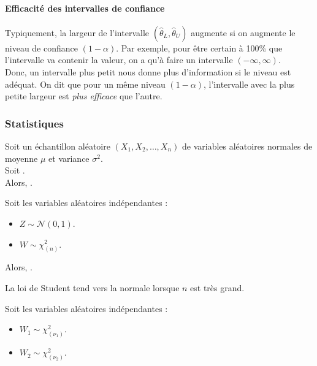 \documentclass[10pt, french]{article}
\begin{document}
\begin{multicols*}{2}
\paragraph{Efficacité des intervalles de confiance}
Typiquement, la largeur de l'intervalle $(\hat{\theta}_{L}, \hat{\theta}_{U})$ augmente si on augmente le niveau de confiance $(1 - \alpha)$. Par exemple, pour être certain à 100\% que l'intervalle va contenir la valeur, on a qu'à faire un intervalle $(-\infty, \infty)$.\\

Donc, un intervalle plus petit nous donne plus d'information si le niveau est adéquat. On dit que pour un même niveau $(1 - \alpha)$, l'intervalle avec la plus petite largeur est \textit{plus efficace} que l'autre.

\subsubsection{Statistiques}
\begin{rappel_enhanced}
Soit un échantillon aléatoire $(X_{1}, X_{2}, \dots, X_{n})$ de variables aléatoires normales de moyenne $\mu$ et variance $\sigma^{2}$.\\
Soit .\\

Alors, .
\end{rappel_enhanced}

\begin{rappel_enhanced}
Soit les variables aléatoires indépendantes :
\begin{itemize}
	\item	$Z \sim \mathcal{N}(0, 1)$.
	\item	$W \sim \chi^{2}_{(n)}$.
\end{itemize}

Alors, .\\

\tcbline

La loi de Student tend vers la normale lorsque $n$ est très grand.
\end{rappel_enhanced}

\begin{rappel_enhanced}
Soit les variables aléatoires indépendantes :
\begin{itemize}
	\item	$W_{1} \sim \chi^{2}_{(\nu_{1})}$.
	\item	$W_{2} \sim \chi^{2}_{(\nu_{2})}$.
\end{itemize}


\end{rappel_enhanced}
\end{multicols*}
\end{document}

